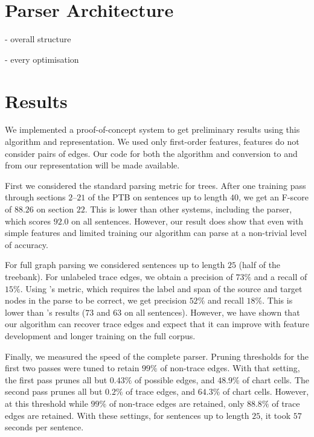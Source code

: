 \section{Parser Architecture}

- overall structure

- every optimisation

\section{Results}

We implemented a proof-of-concept system to get preliminary results using this algorithm and representation.
We used only first-order features, \ie features do not consider pairs of edges.
Our code for both the algorithm and conversion to and from our representation will be made available.

First we considered the standard parsing metric for trees.
After one training pass through sections $2$--$21$ of the PTB on sentences up to length $40$, we get an F-score of $88.26$ on section $22$.
This is lower than other systems, including the \cite{cck} parser, which scores $92.0$ on all sentences.
However, our result does show that even with simple features and limited training our algorithm can parse at a non-trivial level of accuracy.

For full graph parsing we considered sentences up to length $25$ (half of the treebank).
For unlabeled trace edges, we obtain a precision of $73\%$ and a recall of $15\%$.
Using \cite{Johnson:2002}'s metric, which requires the label and span of the source and target nodes in the parse to be correct, we get precision $52\%$ and recall $18\%$.
This is lower than \cite{Johnson:2002}'s results ($73$ and $63$ on all sentences).
However, we have shown that our algorithm can recover trace edges and expect that it can improve with feature development and longer training on the full corpus.

Finally, we measured the speed of the complete parser.
Pruning thresholds for the first two passes were tuned to retain $99\%$ of non-trace edges.
With that setting, the first pass prunes all but $0.43\%$ of possible edges, and $48.9\%$ of chart cells.
The second pass prunes all but $0.2\%$ of trace edges, and $64.3\%$ of chart cells.
However, at this threshold while $99\%$ of non-trace edges are retained, only $88.8\%$ of trace edges are retained.
With these settings, for sentences up to length $25$, it took $57$ seconds per sentence.

